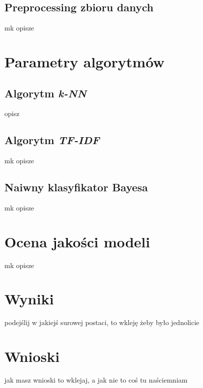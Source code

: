 \documentclass[a4paper,12pt]{article}
\begin{document}
\subsection{Preprocessing zbioru danych}

mk opisze

\section{Parametry algorytmów} %

\subsection{Algorytm \textit{k-NN}}

opisz

\subsection{Algorytm \textit{TF-IDF}}

mk opisze

\subsection{Naiwny klasyfikator Bayesa}

mk opisze

\section{Ocena jakości modeli} %

mk opisze

\section{Wyniki}

podejślij w jakiejś surowej postaci, to wkleję żeby było jednolicie

\section{Wnioski}

jak masz wnioski to wklejaj, a jak nie to coś tu naściemniam
\end{document}
